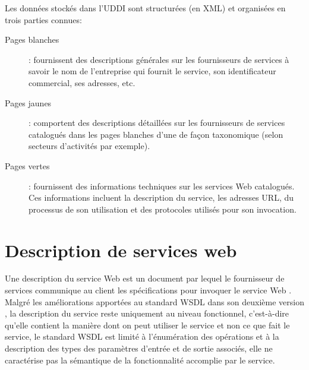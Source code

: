 
  Les données stockés dans l'\textsc{UDDI} sont structurées (en
  \textsc{XML}) et organisées en trois parties connues:

  \SpecialItem
  \begin{description}
    \item[Pages blanches]: fournissent des descriptions générales sur
      les fournisseurs de services à savoir le nom de l'entreprise qui
      fournit le service, son identificateur commercial, ses adresses,
      etc.

    \item[Pages jaunes]: comportent des descriptions détaillées sur
      les fournisseurs de services catalogués dans les pages blanches
      d'une de façon taxonomique (selon secteurs d'activités par
      exemple).

    \item[Pages vertes]: fournissent des informations techniques sur
      les services Web catalogués. Ces informations incluent la
      description du service, les adresses \textsc{URL}, du processus
      de son utilisation et des protocoles utilisés pour son
      invocation.
  \end{description}



\section{Description de services web}
\label{sec:ws-description}


Une description du service Web est un document par lequel le
fournisseur de services communique au client les spécifications pour
invoquer le service Web \cite{lopez2008selection}. Malgré les
améliorations apportées au standard \textsc{WSDL} dans son deuxième
version \cite{chinnici2007web}, la description du service reste
uniquement au niveau fonctionnel, c'est-à-dire qu'elle contient la
manière dont on peut utiliser le service et non ce que fait le
service, le standard \textsc{WSDL} est limité à l'énumération des
opérations et à la description des types des paramètres d'entrée et de
sortie associés, elle ne caractérise pas la sémantique de la
fonctionnalité accomplie par le service.

